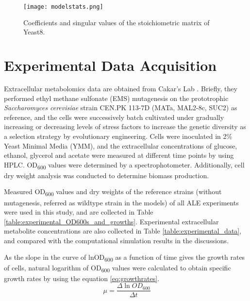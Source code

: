 \begin{figure}[H]
\begin{center}
\texttt{[image: modelstats.png]}
\end{center}
\caption[Coefficients and singular values of the stoichiometric matrix of Yeast8.]{Coefficients and singular values of the stoichiometric matrix of Yeast8.}
\label{fig:modelstats}
\end{figure}



\section{Experimental Data Acquisition} \label{experimentaldataacquisition}
Extracellular metabolomics data are obtained from Cakar's Lab \cite{arslan2018physiological}. Briefly, they performed ethyl methane sulfonate (EMS) mutagenesis on the prototrophic \emph{Saccharomyces cerevisiae} strain CEN.PK 113-7D (MATa, MAL2-8c, SUC2) as reference, and the cells were successively batch cultivated under gradually increasing or decreasing levels of stress factors to increase the genetic diversity as a selection strategy by evolutionary engineering. Cells were inoculated in 2\% Yeast Minimal Media (YMM), and the extracellular concentrations of glucose, ethanol, glycerol and acetate were measured at different time points by using HPLC. OD\textsubscript{600} values were determined by a spectrophotometer. Additionally, cell dry weight analysis was conducted to determine biomass production.

Measured OD\textsubscript{600} values and dry weights of the reference strains (without mutagenesis, referred as wildtype strain in the models) of all ALE experiments were used in this study, and are collected in Table \ref{table:experimental_OD600s_and_growths}. Experimental extracellular metabolite concentrations are also collected in Table \ref{table:experimental_data}, and compared with the computational simulation results in the discussions.




As the slope in the curve of lnOD\textsubscript{600} as a function of time gives the growth rates of cells, natural logarithm of OD\textsubscript{600} values were calculated to obtain specific growth rates by using the equation \ref{eq:growthrates}.
  \begin{equation}
      \ \mu = \frac{\Delta \ln{OD_{600}}}{\Delta t}
      \label{eq:growthrates}
  \end{equation}


